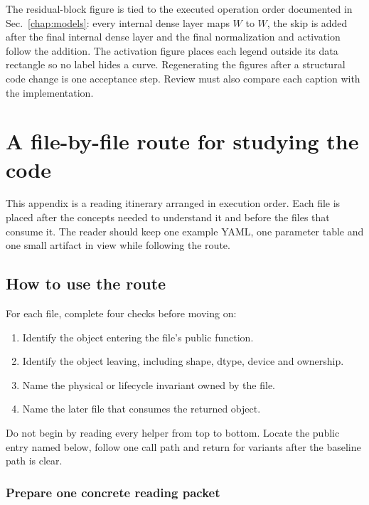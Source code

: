 \documentclass[10pt,aps,prd,twocolumn,nofootinbib]{revtex4-2}
\begin{document}
The residual-block figure is tied to the executed operation order documented
in Sec.~\ref{chap:models}: every internal dense layer maps $W$ to $W$, the
skip is added after the final internal dense layer and the final normalization
and activation follow the addition.  The activation figure places each legend
outside its data rectangle so no label hides a curve.  Regenerating the
figures after a structural code change is one acceptance step.  Review must
also compare each caption with the implementation.

\appendix

\section{A file-by-file route for studying the code}
\label{app:study-route}

This appendix is a reading itinerary arranged in execution order.  Each file
is placed after the concepts needed to understand it and before the files that
consume it.  The reader should keep one example YAML, one parameter table and
one small artifact in view while following the route.

\subsection{How to use the route}

For each file, complete four checks before moving on:
\begin{enumerate}
  \item Identify the object entering the file's public function.
  \item Identify the object leaving, including shape, dtype, device and ownership.
  \item Name the physical or lifecycle invariant owned by the file.
  \item Name the later file that consumes the returned object.
\end{enumerate}
Do not begin by reading every helper from top to bottom.  Locate the public
entry named below, follow one call path and return for variants after the
baseline path is clear.

\subsubsection{Prepare one concrete reading packet}
\end{document}
